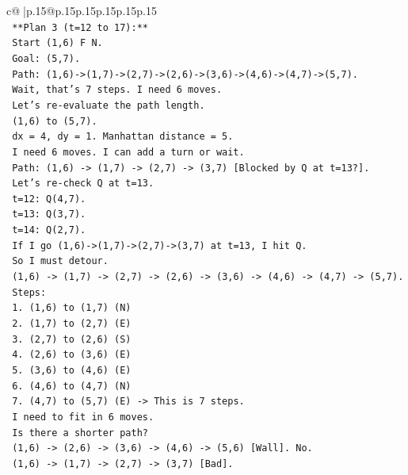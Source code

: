 \documentclass{article}
\begin{document}
{\begin{supertabular}{c@{$\;$}|p{.15\linewidth}@{}p{.15\linewidth}p{.15\linewidth}p{.15\linewidth}p{.15\linewidth}p{.15\linewidth}}
{{{\\ 
\texttt{    **Plan 3 (t=12 to 17):**} \\
\texttt{    Start (1,6) F N.} \\
\texttt{    Goal: (5,7).} \\
\texttt{    Path: (1,6){-}>(1,7){-}>(2,7){-}>(2,6){-}>(3,6){-}>(4,6){-}>(4,7){-}>(5,7).} \\
\texttt{    Wait, that's 7 steps. I need 6 moves.} \\
\texttt{    Let's re{-}evaluate the path length.} \\
\texttt{    (1,6) to (5,7).} \\
\texttt{    dx = 4, dy = 1. Manhattan distance = 5.} \\
\texttt{    I need 6 moves. I can add a turn or wait.} \\
\texttt{    Path: (1,6) {-}> (1,7) {-}> (2,7) {-}> (3,7) {[}Blocked by Q at t=13?{]}.} \\
\texttt{    Let's re{-}check Q at t=13.} \\
\texttt{    t=12: Q(4,7).} \\
\texttt{    t=13: Q(3,7).} \\
\texttt{    t=14: Q(2,7).} \\
\texttt{    If I go (1,6){-}>(1,7){-}>(2,7){-}>(3,7) at t=13, I hit Q.} \\
\texttt{    So I must detour.} \\
\texttt{    (1,6) {-}> (1,7) {-}> (2,7) {-}> (2,6) {-}> (3,6) {-}> (4,6) {-}> (4,7) {-}> (5,7).} \\
\texttt{    Steps:} \\
\texttt{    1. (1,6) to (1,7) (N)} \\
\texttt{    2. (1,7) to (2,7) (E)} \\
\texttt{    3. (2,7) to (2,6) (S)} \\
\texttt{    4. (2,6) to (3,6) (E)} \\
\texttt{    5. (3,6) to (4,6) (E)} \\
\texttt{    6. (4,6) to (4,7) (N)} \\
\texttt{    7. (4,7) to (5,7) (E) {-}> This is 7 steps.} \\
\texttt{    I need to fit in 6 moves.} \\
\texttt{    Is there a shorter path?} \\
\texttt{    (1,6) {-}> (2,6) {-}> (3,6) {-}> (4,6) {-}> (5,6) {[}Wall{]}. No.} \\
\texttt{    (1,6) {-}> (1,7) {-}> (2,7) {-}> (3,7) {[}Bad{]}.} \\
}}}
\end{supertabular}}
\end{document}
